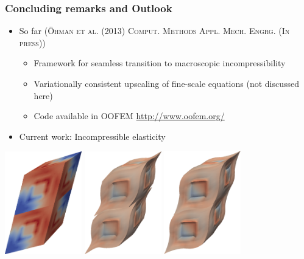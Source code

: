 \documentclass[11pt]{beamer} %
\newcommand{\roughcite}[1]{\textsc{#1}}
\begin{document}
\begin{frame}
 \frametitle{Concluding remarks and Outlook}
 \begin{itemize}
  \item So far (\roughcite{\"Ohman et al. (2013) Comput. Methods Appl. Mech. Engrg. (In press)})

  \begin{itemize}
   \item Framework for seamless transition to macroscopic incompressibility
   \item Variationally consistent upscaling of fine-scale equations (not discussed here)
   \item Code available in OOFEM  \url{http://www.oofem.org/}
  \end{itemize}
  \item Current work: Incompressible elasticity
 \end{itemize}
 \begin{center}
  \includegraphics[width=0.25\textwidth]{figures/elastic_dirichlet.png}
  \includegraphics[width=0.25\textwidth]{figures/elastic_neumann.png}
  \includegraphics[width=0.25\textwidth]{figures/elastic_periodic3.png}
 \end{center}
\end{frame}
\end{document}
